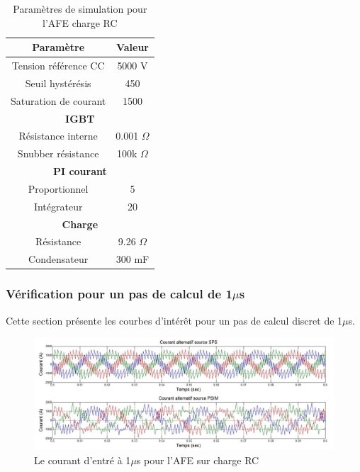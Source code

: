 \documentclass[11pt,letterpaper,final]{report}
\begin{document}
\begin{table}[htb]
\centering
\begin{tabular}{|c|c|} 
  \hline
  Paramètre & Valeur  \\
  \hline\hline
  Tension référence CC & 5000 V\\ \hline
  Seuil hystérésis & 450\\ \hline
  Saturation de courant& 1500 \\ \hline \hline
  \multicolumn{2}{|c|}{\textbf{IGBT}}\\ \hline
  Résistance interne & 0.001 $\Omega$\\
  Snubber résistance & 100k $\Omega$\\ \hline \hline
   \multicolumn{2}{|c|}{\textbf{PI courant}}\\ \hline
  Proportionnel & 5 \\
  Intégrateur & 20 \\ \hline \hline
  \multicolumn{2}{|c|}{\textbf{Charge}}\\ \hline
  Résistance & 9.26 $\Omega$ \\
  Condensateur & 300 mF\\
  \hline
\end{tabular}
\caption{Paramètres de simulation pour l'AFE charge RC}
\label{p_AF_RC}
\end{table}


\subsubsection{Vérification pour un pas de calcul de 1$\mu$s}
Cette section présente les courbes d'intérêt pour un pas de calcul discret de 1$\mu$s. 




\begin{figure}[htb]
\centering
\includegraphics[scale=0.5]{Fig/AFERC/cour_al.jpg}
\caption{Le courant d'entré à 1$\mu$s pour l'AFE sur charge RC}
\label{AF_RC_cou}
\end{figure}
\end{document}
